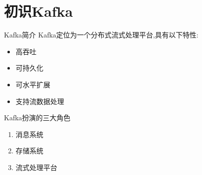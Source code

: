 \section{初识Kafka}
\begin{frame}[plain,t]{Kafka简介} %
	  \vspace{2ex}
	Kafka定位为一个分布式流式处理平台,具有以下特性:
	\begin{itemize}
		\item 高吞吐
		\item 可持久化
		\item 可水平扩展
		\item 支持流数据处理
	\end{itemize}
	\vspace{2ex}
	
	Kafka扮演的三大角色
	\begin{enumerate}
		\item 消息系统
		\item 存储系统
		\item 流式处理平台
	\end{enumerate}
	

	
	
\end{frame}
